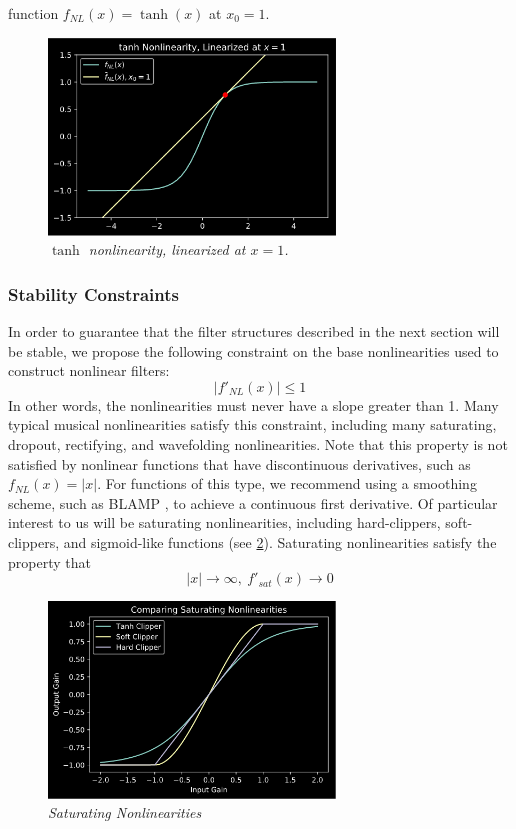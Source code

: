 \documentclass[twoside,a4paper]{article}
\begin{document}
function $f_{NL}(x) = \tanh(x)$ at $x_0=1$.
%
\begin{figure}[h]
    \center
    \includegraphics[width=3in]{../Pics/tanh_linized.png}
    \caption{\label{tanh_lin}{\it $\tanh$ nonlinearity, linearized at $x=1$.}}
\end{figure}
%
\subsubsection{Stability Constraints}

In order to guarantee that the filter structures described in the
next section will be stable, we propose the following constraint
on the base nonlinearities used to construct nonlinear filters:
%
\begin{equation}
    \left| f'_{NL}(x) \right| \leq 1
    \label{eq:NL_constraint}
\end{equation}
%
In other words, the nonlinearities must never have
a slope greater than 1. Many typical musical nonlinearities satisfy
this constraint, including many saturating, dropout, rectifying,
and wavefolding nonlinearities. Note that this property is not satisfied by
nonlinear functions that have discontinuous derivatives, such as
$f_{NL}(x) = |x|$. For functions of this type, we recommend using a
smoothing scheme, such as BLAMP \cite{BLAMP}, to achieve a continuous
first derivative.
\newline\newline
Of particular interest to us will be saturating
nonlinearities, including hard-clippers, soft-clippers, and sigmoid-like
functions (see \cref{Sats}).
Saturating nonlinearities satisfy the property that
%
\begin{equation}
    |x| \rightarrow \infty, \ f'_{sat}(x) \rightarrow 0
    \label{eq:Sat_constraint}
\end{equation}
%
\begin{figure}[h]
    \center
    \includegraphics[width=3in]{../Pics/Sat-NLs.png}
    \caption{\label{Sats}{\it Saturating Nonlinearities}}
\end{figure}
%
\end{document}
